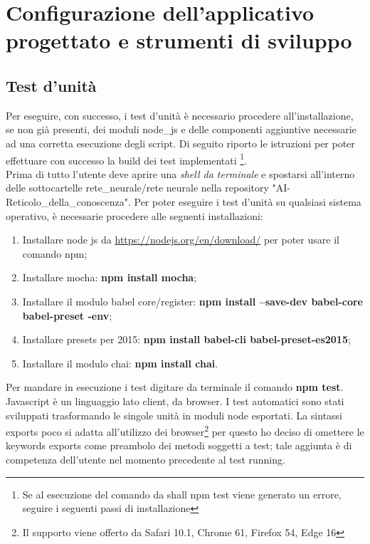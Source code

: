 \section{Configurazione dell'applicativo progettato e strumenti di sviluppo}

\subsection{Test d'unit\`a}
\label{Test d'unita}
Per eseguire, con successo, i test d'unità è necessario procedere all'installazione, se non gi\`a presenti, dei moduli node\_js e delle componenti aggiuntive necessarie ad una corretta esecuzione degli script. Di seguito riporto le istruzioni per poter effettuare con successo la build dei test implementati \footnote{Se al esecuzione del comando da shall npm test viene generato un errore, seguire i seguenti passi di installazione}.\\
Prima di tutto l'utente deve aprire una \textit{shell da terminale} e spostarsi all'interno delle sottocartelle rete\_neurale/rete neurale nella repository "AI-Reticolo\_della\_conoscenza".
Per poter eseguire i test d'unit\`a su qualsiasi sistema operativo, \`e necessarie procedere alle seguenti installazioni:
\begin{enumerate}
 \item Installare node js da \url{https://nodejs.org/en/download/} per poter usare il comando npm;
 \item Installare mocha: \textbf{npm install mocha};
 \item Installare  il modulo babel core/register: \textbf{npm install --save-dev babel-core babel-preset -env};
 \item Installare presets per 2015:  \textbf{npm install babel-cli babel-preset-es2015};
 \item Installare il modulo chai: \textbf{npm install chai}.
\end{enumerate}
\noindent
Per mandare in esecuzione i test digitare da terminale il comando \textbf{npm test}.\\
Javascript \`e un linguaggio lato client, da browser. I test automatici sono stati sviluppati trasformando le singole unit\`a in moduli node esportati. La sintassi exports poco si adatta all'utilizzo dei browser\footnote{Il supporto viene offerto da Safari 10.1, Chrome 61, Firefox 54, Edge 16} per questo ho deciso di omettere le keywords exports come preambolo dei metodi soggetti a test; tale aggiunta \`e di competenza dell'utente nel momento precedente al test running.

